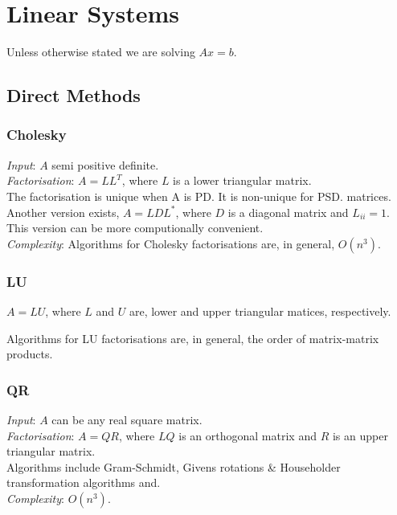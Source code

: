 \section{Linear Systems}

Unless otherwise stated we are solving $Ax=b$.

\subsection{Direct Methods}

\subsubsection{Cholesky}

\textit{Input}: $A$ semi positive definite.\\
\textit{Factorisation}: $A=LL^T$, where $L$ is a lower triangular matrix.\\

The factorisation is unique when A is PD. It is non-unique for PSD. matrices. Another version exists, $A=LDL^*$, where $D$ is a diagonal matrix and $L_{ii}=1$. This version can be more computionally convenient.\\

\textit{Complexity}: Algorithms for Cholesky factorisations are, in general, $O(n^3)$. 
\subsubsection{LU} $A=LU$, where $L$ and $U$ are, lower and upper triangular matices, respectively.

Algorithms for LU factorisations are, in general, the order of matrix-matrix products.

\subsubsection{QR}

\textit{Input}: $A$ can be any real square matrix.\\
\textit{Factorisation}: $A = QR$, where $LQ$ is an orthogonal matrix and $R$ is an upper triangular matrix.\\

Algorithms include Gram-Schmidt, Givens rotations \& Householder transformation
algorithms and.\\

\textit{Complexity}: $O(n^3)$. 

